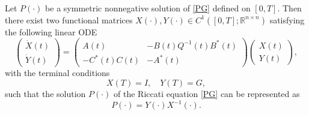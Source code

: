 \documentclass{IEEEtran}
\begin{document}
	\begin{lemma}\label{PG1}
		Let $P(\cdot)$ be a symmetric nonnegative solution of \eqref{PG} defined on $[0,T]$.
		Then there exist two functional matrices $X(\cdot), Y(\cdot) \in C^1([0,T];\mathbb R^{n \times n})$ satisfying the following linear ODE
		\begin{equation}
			\begin{pmatrix}
				\dot{X}(t)\\\dot{Y}(t)
			\end{pmatrix}=
			\begin{pmatrix}
				A(t) & -B(t)Q^{-1}(t)B^*(t)\\
				-C^*(t)C(t)&-A^*(t)
			\end{pmatrix}
			\begin{pmatrix}
				X(t)\\ Y (t)
			\end{pmatrix},
		\end{equation}
		with the terminal conditions
		\begin{equation}
			X(T)=I,\quad Y(T)=G,
		\end{equation}
		such that the solution $P(\cdot)$ of the Riccati equation \eqref{PG} can be represented as
		\begin{equation}
			P(\cdot)=Y(\cdot)X^{-1}(\cdot).
		\end{equation}
	\end{lemma}
	
\end{document}
